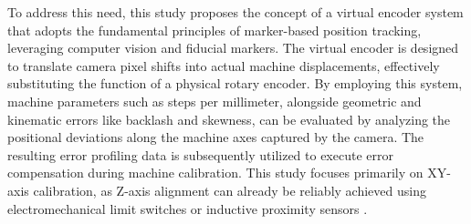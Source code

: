 To address this need, this study proposes the concept of a virtual encoder system that adopts the fundamental principles of marker-based position tracking, leveraging computer vision and fiducial markers. The virtual encoder is designed to translate camera pixel shifts into actual machine displacements, effectively substituting the function of a physical rotary encoder. By employing this system, machine parameters such as steps per millimeter, alongside geometric and kinematic errors like backlash and skewness, can be evaluated by analyzing the positional deviations along the machine axes captured by the camera. The resulting error profiling data is subsequently utilized to execute error compensation during machine calibration. This study focuses primarily on XY-axis calibration, as Z-axis alignment can already be reliably achieved using electromechanical limit switches or inductive proximity sensors \cite{Schouten2022}.